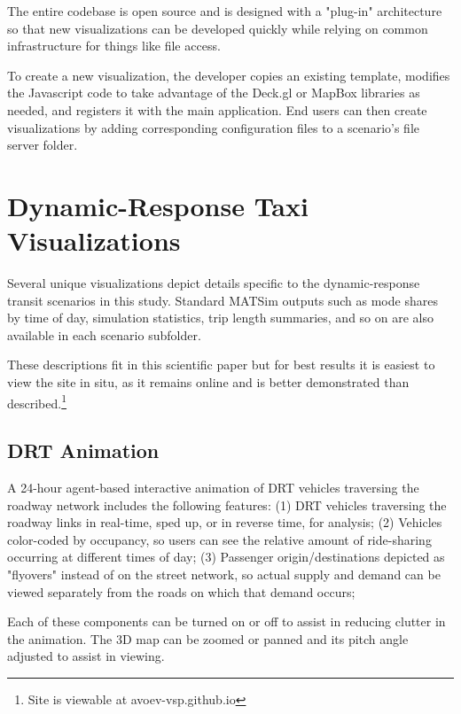 \documentclass[3p,times,procedia]{elsarticle}
\begin{document}
The entire codebase is open source and is designed with a "plug-in" architecture so that new visualizations can be developed quickly while relying on common infrastructure for things like file access.

To create a new visualization, the developer copies an existing template, modifies the Javascript code to take advantage of the Deck.gl or MapBox libraries as needed, and registers it with the main application. End users can then create visualizations by adding corresponding configuration files to a scenario's file server folder.

\section{Dynamic-Response Taxi Visualizations}
\label{drtviz}

Several unique visualizations depict details specific to the dynamic-response transit scenarios in this study. Standard MATSim outputs such as mode shares by time of day, simulation statistics, trip length summaries, and so on are also available in each scenario subfolder.

These descriptions fit in this scientific paper but for best results it is easiest to view the site in situ, as it remains online and is better demonstrated than described.\footnote{Site is viewable at avoev-vsp.github.io}

\subsection{DRT Animation}

A 24-hour agent-based interactive animation of DRT vehicles traversing the roadway network includes the following features: (1) DRT vehicles traversing the roadway links in real-time, sped up, or in reverse time, for analysis; (2) Vehicles color-coded by occupancy, so users can see the relative amount of ride-sharing occurring at different times of day; (3) Passenger origin/destinations depicted as "flyovers" instead of on the street network, so actual supply and demand can be viewed separately from the roads on which that demand occurs;

Each of these components can be turned on or off to assist in reducing clutter in the animation. The 3D map can be zoomed or panned and its pitch angle adjusted to assist in viewing.
\end{document}
